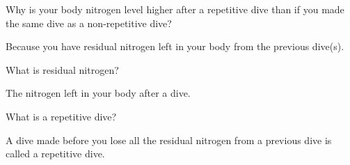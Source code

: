 	\begin{qanda}
		\begin{question}
Why is your body nitrogen level higher after a repetitive dive than if you made the same dive as a non-repetitive dive?
		\end{question}

		\begin{answer}
Because you have residual nitrogen left in your body from the previous dive(s).
		\end{answer}
	\end{qanda}

	\begin{qanda}
		\begin{question}
What is residual nitrogen?
		\end{question}

		\begin{answer}
The nitrogen left in your body after a dive.
		\end{answer}
	\end{qanda}

	\begin{qanda}
		\begin{question}
What is a repetitive dive?
		\end{question}

		\begin{answer}
A dive made before you lose all the residual nitrogen from a previous dive is called a repetitive dive.
		\end{answer}
	\end{qanda}

